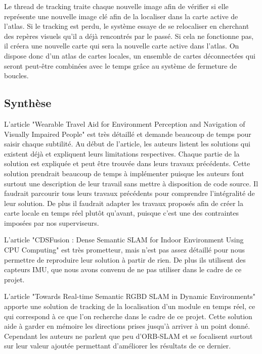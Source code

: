\documentclass[11pt]{article}
\begin{document}
          Le thread de tracking traite chaque nouvelle image afin de vérifier si elle représente une nouvelle image clé afin de la localiser
          dans la carte active de l'atlas. Si le tracking est perdu, le système essaye de se relocaliser en cherchant des repères visuels 
          qu'il a déjà rencontrés par le passé. Si cela ne fonctionne pas, il créera une nouvelle carte qui sera la nouvelle carte active dans l'atlas.
          On dispose donc d'un atlas de cartes locales, un ensemble de cartes déconnectées qui seront peut-être combinées avec le temps grâce au 
          système de fermeture de boucles.

        \pagebreak

    \subsection{Synthèse}
      L'article "Wearable Travel Aid for Environment Perception and Navigation of Visually Impaired People" est très détaillé et demande beaucoup 
      de temps pour saisir chaque subtilité.
      Au début de l'article, les auteurs listent les solutions qui existent déjà et expliquent leurs limitations respectives. 
      Chaque partie de la solution est expliquée et peut être trouvée dans leurs travaux précédents. Cette solution prendrait beaucoup de temps
      à implémenter puisque les auteurs font surtout une description de leur travail sans mettre à disposition de code source. 
      Il faudrait parcourir tous leurs travaux précédents pour comprendre l'intégralité de leur solution. De plus il faudrait adapter les travaux
      proposés afin de créer la carte locale en temps réel plutôt qu'avant, puisque c'est une des contraintes imposées par nos superviseurs. 

      L'article "CDSFusion : Dense Semantic SLAM for Indoor Environment Using CPU Computing" est très prometteur, mais n'est pas assez détaillé 
      pour nous permettre de reproduire leur solution à partir de rien. De plus ils utilisent des capteurs IMU, que nous avons convenu de ne pas 
      utiliser dans le cadre de ce projet.

      L'article "Towards Real-time Semantic RGBD SLAM in Dynamic Environments" apporte une solution de tracking de la localisation 
      d'un module en temps réel, ce qui correspond à ce que l'on recherche dans le cadre de ce projet. Cette solution aide à garder en 
      mémoire les directions prises jusqu'à arriver à un point donné. Cependant les auteurs ne parlent que peu d'ORB-SLAM et se focalisent 
      surtout sur leur valeur ajoutée permettant d'améliorer les résultats de ce dernier.
\end{document}
